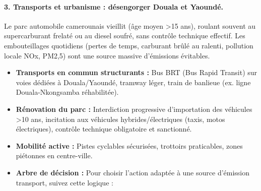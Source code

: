 \documentclass[11pt]{article}
\begin{document}
\paragraph{3. Transports et urbanisme : désengorger Douala et Yaoundé.}
Le parc automobile camerounais vieillit (âge moyen \textgreater 15 ans), roulant souvent au supercarburant frelaté ou au diesel soufré, sans contrôle technique effectif. Les embouteillages quotidiens (pertes de temps, carburant brûlé au ralenti, pollution locale NOx, PM2,5) sont une source massive d'émissions évitables.
\begin{itemize}
    \item \textbf{Transports en commun structurants :} Bus BRT (Bus Rapid Transit) sur voies dédiées à Douala/Yaoundé, tramway léger, train de banlieue (ex. ligne Douala-Nkongsamba réhabilitée).
    \item \textbf{Rénovation du parc :} Interdiction progressive d'importation des véhicules \textgreater 10 ans, incitation aux véhicules hybrides/électriques (taxis, motos électriques), contrôle technique obligatoire et sanctionné.
    \item \textbf{Mobilité active :} Pistes cyclables sécurisées, trottoirs praticables, zones piétonnes en centre-ville.
    \item \textbf{Arbre de décision :} Pour choisir l'action adaptée à une source d'émission transport, suivez cette logique :
\end{itemize}
\end{document}
